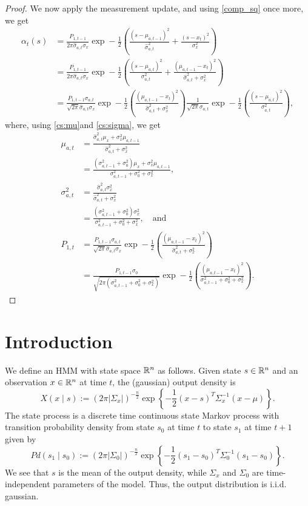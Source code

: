 \documentclass[12pt,leqno]{article}
\begin{document}
\begin{proof}
We now apply the measurement update, and using \eqref{comp_sq} once more, we get
\begin{align*}
  \alpha_t(s) &= \frac{P_{1,t-1}}{2\pi\hat{\sigma}_{a,t}\sigma_x}
  \exp-\frac{1}{2}\left(\frac{(s-\mu_{a,t-1})^2}{\hat{\sigma}_{a,t}^2} + \frac{(s-x_t)^2}{\sigma_x^2}\right)\\
  &= \frac{P_{1,t-1}}{2\pi\hat{\sigma}_{a,t}\sigma_x}
  \exp-\frac{1}{2}\left(\frac{(s-\mu_{a,t})^2}{\sigma_{a,t}^2 } +
  \frac{(\mu_{a,t-1}-x_t)^2}{\hat{\sigma}_{a,t}^2 +\sigma_x^2}\right)\\
  &= \frac{P_{1,t-1}\sigma_{a,t}}{\sqrt{2\pi}\hat{\sigma}_{a,t}\sigma_x}\exp-\frac{1}{2}\left(\frac{(\mu_{a,t-1}-x_t)^2}{\hat{\sigma}_{a,t}^2 +\sigma_x^2}\right)\frac{1}{\sqrt{2\pi}\sigma_{a,t}}\exp-\frac{1}{2}\left(\frac{(s-\mu_{a,t})^2}{\sigma_{a,t}^2 }
  \right),
\end{align*}
where, using \eqref{cs:mu}and \eqref{cs:sigma}, we get
\begin{align*}
  \mu_{a,t} &= \frac{\hat{\sigma}_{a,t}^2\mu_x + \sigma_x^2\mu_{a,t-1}}{\hat{\sigma}_{a,t}^2+\sigma_x^2}\\
  &= \frac{(\sigma_{a,t-1}^2+\sigma_0^2)\mu_x + \sigma_x^2\mu_{a,t-1}}{\sigma_{a,t-1}^2+\sigma_0^2+\sigma_x^2}, \\ 
  \sigma_{a,t}^2 &= \frac{\hat{\sigma}_{a,t}^2\sigma_x^2}{\hat{\sigma}_{a,t}^2 + \sigma_x^2} \\
  &= \frac{(\sigma_{a,t-1}^2+\sigma_0^2)\sigma_x^2}{\sigma_{a,t-1}^2+\sigma_0^2+\sigma_x^2}, \quad\text{and}\\
  P_{1,t}&= \frac{P_{1,t-1}\sigma_{a,t}}{\sqrt{2\pi}\hat{\sigma}_{a,t}\sigma_x}\exp-\frac{1}{2}\left(\frac{(\mu_{a,t-1}-x_t)^2}{\hat{\sigma}_{a,t}^2 +\sigma_x^2}\right)\\
  &= \frac{P_{1,t-1}\sigma_0}{\sqrt{2\pi(\sigma_{a,t-1}^2+\sigma_0^2+\sigma_x^2)}}\exp-\frac{1}{2}\left(\frac{(\mu_{a,t-1}-x_t)^2}
    {\sigma_{a,t-1}^2+\sigma_0^2 +\sigma_x^2}\right).
\end{align*}
\end{proof}  


\section{Introduction}
We define an HMM with state space ${\mathbb R}^n$ as follows.  Given state $s\in{\mathbb R}^n$ and an observation $x\in{\mathbb R}^n$ at time
$t$, the (gaussian) output density is
$$
X(x\mid s) := ({2\pi}|\Sigma_x|)^{-\frac{n}{2}}\exp\left\{-\frac{1}{2}
(x-s)^T\Sigma_x^{-1}(x-\mu)\right\}.
$$
The state process is a discrete time continuous state Markov process with transition probability density
from state $s_0$ at time $t$ to state $s_1$ at time $t+1$ given by
$$
Pd(s_1\mid s_0) :=  ({2\pi}|\Sigma_0|)^{-\frac{n}{2}}\exp\left\{-\frac{1}{2}(s_1-s_0)^T\Sigma_0^{-1}(s_1-s_0)\right\}.
$$
We see that $s$ is the mean of the output density, while $\Sigma_x$ and $\Sigma_0$ are time-independent
parameters of the model. Thus, the output distribution is i.i.d. gaussian.
\end{document}

